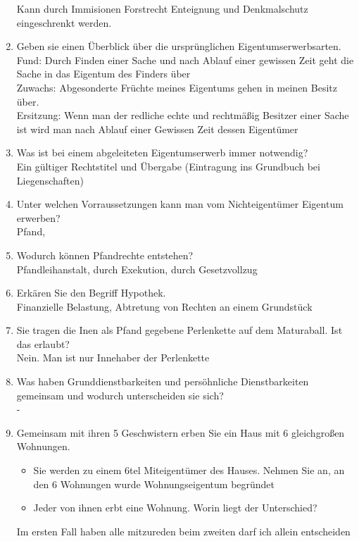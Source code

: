 \documentclass[a4paper]{report}
\begin{document}
\begin{enumerate}
Kann durch Immisionen Forstrecht Enteignung und Denkmalschutz eingeschrenkt werden.
\item Geben sie einen Überblick über die ursprünglichen Eigentumserwerbsarten.\\
Fund: Durch Finden einer Sache und nach Ablauf einer gewissen Zeit geht die Sache in das Eigentum des Finders über\\
Zuwachs: Abgesonderte Früchte meines Eigentums gehen in meinen Besitz über.\\
Ersitzung: Wenn man der redliche echte und rechtmäßig Besitzer einer Sache ist wird man nach Ablauf einer Gewissen Zeit dessen Eigentümer\\
\item Was ist bei einem abgeleiteten Eigentumserwerb immer notwendig?\\
Ein gültiger Rechtstitel und Übergabe (Eintragung ins Grundbuch bei Liegenschaften)
\item Unter welchen Vorraussetzungen kann man vom Nichteigentümer Eigentum erwerben?\\
Pfand, 
\item Wodurch können Pfandrechte entstehen?\\
Pfandleihanstalt, durch Exekution, durch Gesetzvollzug
\item Erkären Sie den Begriff Hypothek.\\
Finanzielle Belastung, Abtretung von Rechten an einem Grundstück
\item Sie tragen die Inen als Pfand gegebene Perlenkette auf dem Maturaball. Ist das erlaubt?\\
Nein. Man ist nur Innehaber der Perlenkette
\item Was haben Grunddienstbarkeiten und persöhnliche Dienstbarkeiten gemeinsam und wodurch unterscheiden sie sich?\\
-
\item Gemeinsam mit ihren 5 Geschwistern erben Sie ein Haus mit 6 gleichgroßen Wohnungen. \\
\begin{itemize}
\item Sie werden zu einem 6tel Miteigentümer des Hauses. Nehmen Sie an, an den 6 Wohnungen wurde Wohnungseigentum begründet\\
\item Jeder von ihnen erbt eine Wohnung. Worin liegt der Unterschied?\\
\end{itemize}
Im ersten Fall haben alle mitzureden beim zweiten darf ich allein entscheiden

\end{enumerate}
\end{document}
